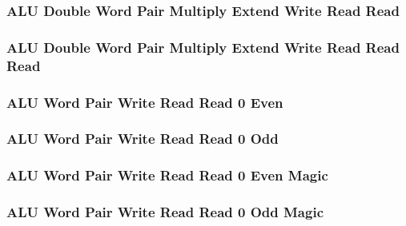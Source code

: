 \subsubsection[{\small ALU Double Word Pair Multiply Extend Write Read Read}]{ALU Double Word Pair Multiply Extend Write Read Read} \label{sec:format-ALU-DPMXWRR}



\subsubsection[{\small ALU Double Word Pair Multiply Extend Write Read Read Read}]{ALU Double Word Pair Multiply Extend Write Read Read Read} \label{sec:format-ALU-DPMXWRRR}



\subsubsection[{\small ALU Word Pair Write Read Read 0 Even}]{ALU Word Pair Write Read Read 0 Even} \label{sec:format-ALU-WPWRR0E}



\subsubsection[{\small ALU Word Pair Write Read Read 0 Odd}]{ALU Word Pair Write Read Read 0 Odd} \label{sec:format-ALU-WPWRR0O}



\subsubsection[{\small ALU Word Pair Write Read Read 0 Even Magic}]{ALU Word Pair Write Read Read 0 Even Magic} \label{sec:format-ALU-WPWRR0E.M}



\subsubsection[{\small ALU Word Pair Write Read Read 0 Odd Magic}]{ALU Word Pair Write Read Read 0 Odd Magic} \label{sec:format-ALU-WPWRR0O.M}

